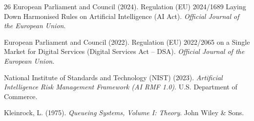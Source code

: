 \begin{thebibliography}{26}
European Parliament and Council (2024). Regulation (EU) 2024/1689 Laying Down Harmonised Rules on Artificial Intelligence (AI Act). \emph{Official Journal of the European Union}.

European Parliament and Council (2022). Regulation (EU) 2022/2065 on a Single Market for Digital Services (Digital Services Act -- DSA). \emph{Official Journal of the European Union}.

National Institute of Standards and Technology (NIST) (2023). \emph{Artificial Intelligence Risk Management Framework (AI RMF 1.0)}. U.S. Department of Commerce.

Kleinrock, L. (1975). \emph{Queueing Systems, Volume I: Theory}. John Wiley \& Sons.

\end{thebibliography}
